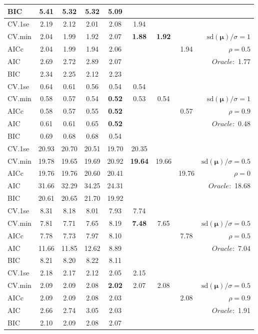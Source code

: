 \begin{table}
\begin{center}
\begin{tabular}{l*{7}{c}|r}
BIC & 5.41 & 5.32 & 5.32 & 5.09 & & & &  \\
 \hline 
CV.1se & 2.19 & 2.12 & 2.01 & 2.08 & 1.94 & & & \\
CV.min & 2.04 & 1.99 & 1.92 & 2.07 & {\bf 1.88} & {\bf 1.92} & & $\mathrm{sd}(\mathbf{\mu})/\sigma=1$ \\
AICc & 2.04 & 1.99 & 1.94 & 2.06 & & & 1.94 &  $\rho=0.5$ \\
AIC & 2.69 & 2.72 & 2.89 & 2.07 & & & &  \multirow{2}{*}{$Oracle: $ 1.77} \\
BIC & 2.34 & 2.25 & 2.12 & 2.23 & & & &  \\
 \hline 
CV.1se & 0.64 & 0.61 & 0.56 & 0.54 & 0.54 & & & \\
CV.min & 0.58 & 0.57 & 0.54 & {\bf 0.52} & 0.53 & 0.54 & & $\mathrm{sd}(\mathbf{\mu})/\sigma=1$ \\
AICc & 0.58 & 0.57 & 0.55 & {\bf 0.52} & & & 0.57 &  $\rho=0.9$ \\
AIC & 0.61 & 0.61 & 0.65 & {\bf 0.52} & & & &  \multirow{2}{*}{$Oracle: $ 0.48} \\
BIC & 0.69 & 0.68 & 0.68 & 0.54 & & & &  \\
 \hline 
CV.1se & 20.93 & 20.70 & 20.51 & 19.70 & 20.35 & & & \\
CV.min & 19.78 & 19.65 & 19.69 & 20.92 & {\bf 19.64} & 19.66 & & $\mathrm{sd}(\mathbf{\mu})/\sigma=0.5$ \\
AICc & 19.76 & 19.76 & 20.60 & 20.41 & & & 19.76 &  $\rho=0$ \\
AIC & 31.66 & 32.29 & 34.25 & 24.31 & & & &  \multirow{2}{*}{$Oracle: $ 18.68} \\
BIC & 20.61 & 20.65 & 21.70 & 19.92 & & & &  \\
 \hline 
CV.1se & 8.31 & 8.18 & 8.01 & 7.93 & 7.74 & & & \\
CV.min & 7.81 & 7.71 & 7.65 & 8.19 & {\bf 7.48} & 7.65 & & $\mathrm{sd}(\mathbf{\mu})/\sigma=0.5$ \\
AICc & 7.78 & 7.73 & 7.97 & 8.10 & & & 7.78 &  $\rho=0.5$ \\
AIC & 11.66 & 11.85 & 12.62 & 8.89 & & & &  \multirow{2}{*}{$Oracle: $ 7.04} \\
BIC & 8.21 & 8.20 & 8.22 & 8.11 & & & &  \\
 \hline 
CV.1se & 2.18 & 2.17 & 2.12 & 2.05 & 2.15 & & & \\
CV.min & 2.09 & 2.09 & 2.08 & {\bf 2.02} & 2.07 & 2.08 & & $\mathrm{sd}(\mathbf{\mu})/\sigma=0.5$ \\
AICc & 2.09 & 2.09 & 2.08 & 2.03 & & & 2.08 &  $\rho=0.9$ \\
AIC & 2.66 & 2.74 & 3.05 & 2.03 & & & &  \multirow{2}{*}{$Oracle: $ 1.91} \\
BIC & 2.10 & 2.09 & 2.08 & 2.07 & & & &  \\
 \hline 
\end{tabular}
\end{center}
\vspace{-1cm}
\end{table}





